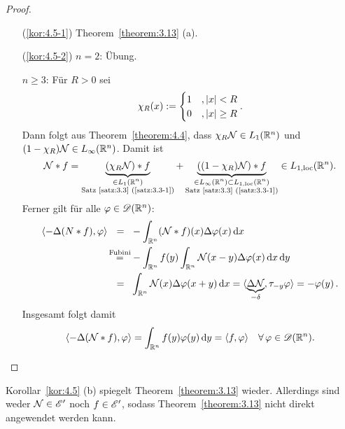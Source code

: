 \begin{proof}
  \begin{itemize}
  \item[(\ref{kor:4.5-1})] Theorem~\ref{theorem:3.13} (a).
  \item[(\ref{kor:4.5-2})] $n=2$: Übung.
    
    $n\geq3$: Für $R>0$ sei
    \[
    \chi_R(x):=\begin{cases}
      1 &,\lvert x\rvert<R \\
      0 &,\lvert x\rvert\geq R
    \end{cases}.
    \]
    Dann folgt aus Theorem~\ref{theorem:4.4}, dass $\chi_R\mathcal{N}\in L_1(\mathbb{R}^n)$ und $(1-\chi_R)\mathcal{N}\in L_\infty(\mathbb{R}^n)$. Damit ist
    \[
      \mathcal{N}\ast f=\underbrace{(\chi_R\mathcal{N})\ast f}_{
        \begin{subarray}{c}
        \in  L_1(\mathbb{R}^n) \\
          \text{Satz~\ref{satz:3.3}~(\ref{satz:3.3-1})}
        \end{subarray}}
      +\underbrace{((1-\chi_R)\mathcal{N})\ast f}_{
        \begin{subarray}{c}
        \in  L_\infty(\mathbb{R}^n)\subset L_{1,\scriptsize{\textnormal{loc}}}(\mathbb{R}^n) \\
          \text{Satz~\ref{satz:3.3}~(\ref{satz:3.3-1})}
        \end{subarray}}
      \in L_{1,\scriptsize{\textnormal{loc}}}(\mathbb{R}^n).
      \]
    Ferner gilt für alle $\varphi\in\mathscr{D}(\mathbb{R}^n)$:
\begin{align*}
	\langle -\Delta (N\ast f),\varphi\rangle \ \ =\ \   & - \int_{\mathbb{R}^n} (\mathcal{N}\ast f)(x) \Delta \varphi (x) \,\mathrm{d} x \\
	\stackrel{\scriptsize\text{Fubini}}= & - \int_{\mathbb{R}^n} f(y) \int_{\mathbb{R}^n}\mathcal{N}(x-y) \Delta \varphi(x) \,\mathrm{d} x \,\mathrm{d} y \\
	= \ \ & \int_{\mathbb{R}^n} \mathcal{N} (x) \Delta \varphi (x+y) \,\mathrm{d} x = \langle \underbrace{\Delta \mathcal{N}}_{-\delta},\tau_{-y}\varphi\rangle = - \varphi (y) \, . 
\end{align*}
Insgesamt folgt damit
\[
	\langle - \Delta (\mathcal{N} \ast f),\varphi\rangle = \int_{\mathbb{R}^n} f(y) \varphi(y) \,\mathrm{d} y = \langle f,\varphi\rangle \quad \forall \, \varphi \in \mathscr{D} (\mathbb{R}^n).
\]
  \end{itemize}
\end{proof}

\begin{bem*}
  Korollar~\ref{kor:4.5} (b) spiegelt Theorem~\ref{theorem:3.13} wieder. Allerdings sind weder $\mathcal{N}\in\mathscr{E}'$ noch $f\in\mathscr{E}'$, sodass Theorem~\ref{theorem:3.13} nicht direkt angewendet werden kann.
\end{bem*}

